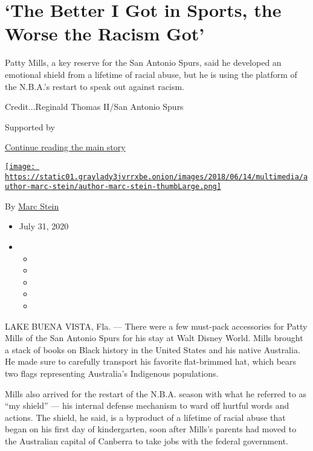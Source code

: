 \hypertarget{the-better-i-got-in-sports-the-worse-the-racism-got}{%
\section{`The Better I Got in Sports, the Worse the Racism
Got'}\label{the-better-i-got-in-sports-the-worse-the-racism-got}}

Patty Mills, a key reserve for the San Antonio Spurs, said he developed
an emotional shield from a lifetime of racial abuse, but he is using the
platform of the N.B.A.'s restart to speak out against racism.

Credit...Reginald Thomas II/San Antonio Spurs

Supported by

\protect\hyperlink{after-sponsor}{Continue reading the main story}

\href{https://www.nytimes3xbfgragh.onion/by/marc-stein}{\texttt{[image: https://static01.graylady3jvrrxbe.onion/images/2018/06/14/multimedia/author-marc-stein/author-marc-stein-thumbLarge.png]}}

By \href{https://www.nytimes3xbfgragh.onion/by/marc-stein}{Marc Stein}

\begin{itemize}
\item
  July 31, 2020
\item
  \begin{itemize}
  \item
  \item
  \item
  \item
  \item
  \end{itemize}
\end{itemize}

LAKE BUENA VISTA, Fla. --- There were a few must-pack accessories for
Patty Mills of the San Antonio Spurs for his stay at Walt Disney World.
Mills brought a stack of books on Black history in the United States and
his native Australia. He made sure to carefully transport his favorite
flat-brimmed hat, which bears two flags representing Australia's
Indigenous populations.

Mills also arrived for the restart of the N.B.A. season with what he
referred to as ``my shield'' --- his internal defense mechanism to ward
off hurtful words and actions. The shield, he said, is a byproduct of a
lifetime of racial abuse that began on his first day of kindergarten,
soon after Mills's parents had moved to the Australian capital of
Canberra to take jobs with the federal government.

